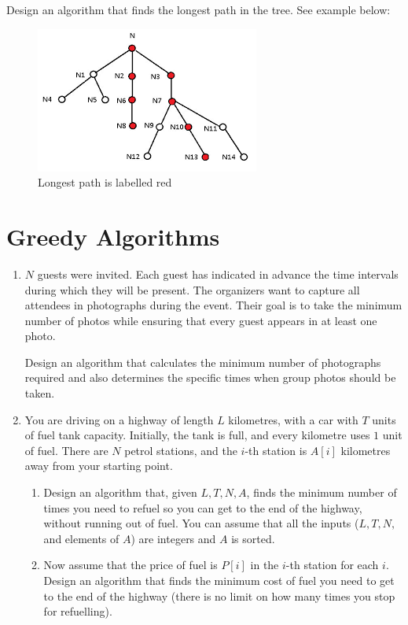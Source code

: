 \documentclass{article}
\begin{document}
\begin{enumerate}
    Design an algorithm that finds the longest path in the tree. See example below:
    \begin{figure}[h]
        \centering
        \includegraphics[width=0.32\linewidth]{longest-path.png}
        \caption{Longest path is labelled red}
        \label{fig:enter-label}
    \end{figure}
\end{enumerate}

\section{Greedy Algorithms}

\begin{enumerate}
    \item $N$ guests were invited. Each guest has indicated in advance the time intervals during which they will be present. The organizers want to capture all attendees in photographs during the event. Their goal is to take the minimum number of photos while ensuring that every guest appears in at least one photo.

    Design an algorithm that calculates the minimum number of photographs required and also determines the specific times when group photos should be taken.
    \item You are driving on a highway of length $L$ kilometres, with a car with  $T$ units of fuel tank capacity. Initially, the tank is full, and every kilometre uses $1$ unit of fuel. There are $N$ petrol stations, and the $i$-th station is $A[i]$ kilometres away from your starting point.
    \begin{enumerate} 
        \item Design an algorithm that, given $L, T, N, A$, finds the minimum number of times you need to refuel so you can get to the end of the highway, without running out of fuel. You can assume that all the inputs ($L,T, N,$ and elements of $A$) are integers and $A$ is sorted.
        \item Now assume that the price of fuel is $P[i]$ in the $i$-th station for each $i$. Design an algorithm that finds the minimum cost of fuel you need to get to the end of the highway (there is no limit on how many times you stop for refuelling).
    \end{enumerate}
\end{enumerate}
\end{document}
